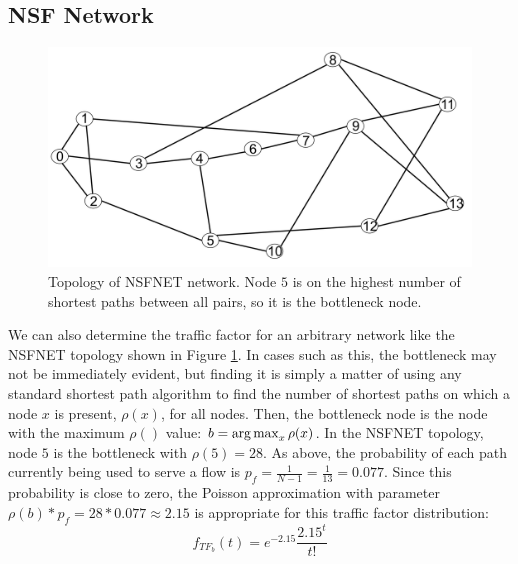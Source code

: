 
\subsection{NSF Network}

\begin{figure}
\begin{centering}
    \includegraphics[scale=0.25]{figures/NSF_net.png}
    \caption{Topology of NSFNET network. Node $5$ is on the highest number of shortest paths between all pairs, so it is the bottleneck node.}
    \label{fig:NSF_net}
\end{centering}
\end{figure}

We can also determine the traffic factor for an arbitrary network like the NSFNET topology \cite{nsf_net} shown in Figure \ref{fig:NSF_net}. In cases such as this, the bottleneck may not be immediately evident, but finding it is simply a matter of using any standard shortest path algorithm to find the number of shortest paths on which a node $x$ is present, $\rho(x)$, for all nodes. Then, the bottleneck node is the node with the maximum $\rho()$ value: $b = \operatorname*{arg\,max}_{x} \rho(x)$. In the NSFNET topology, node $5$ is the bottleneck with $\rho(5) = 28$. As above, the probability of each path currently being used to serve a flow is $p_f = \frac{1}{N-1} = \frac{1}{13} = 0.077$. Since this probability is close to zero, the Poisson approximation with parameter $\rho(b)*p_f = 28*0.077 \approx 2.15$ is appropriate for this traffic factor distribution:
\begin{equation*}
  f_{TF_b}(t) = e^{-2.15} \frac{2.15^t}{t!}
\end{equation*}

